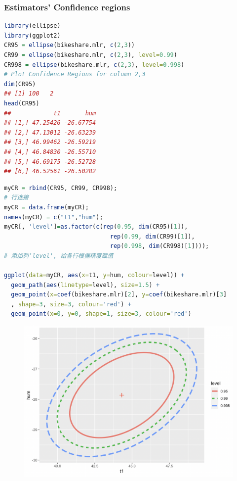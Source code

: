 \documentclass[11pt,a4paper]{article}
\begin{document}
\subsubsection{Estimators' Confidence regions}
\begin{lstlisting}[language=R]
library(ellipse)
library(ggplot2)
CR95 = ellipse(bikeshare.mlr, c(2,3))
CR99 = ellipse(bikeshare.mlr, c(2,3), level=0.99)
CR998 = ellipse(bikeshare.mlr, c(2,3), level=0.998)
# Plot Confidence Regions for column 2,3
dim(CR95)
## [1] 100   2
head(CR95)
##            t1       hum
## [1,] 47.25426 -26.67754
## [2,] 47.13012 -26.63239
## [3,] 46.99462 -26.59219
## [4,] 46.84830 -26.55710
## [5,] 46.69175 -26.52728
## [6,] 46.52561 -26.50282
\end{lstlisting}
\begin{lstlisting}[language=R]
myCR = rbind(CR95, CR99, CR998);
# 行连接
myCR = data.frame(myCR); 
names(myCR) = c("t1","hum"); 
myCR[, 'level']=as.factor(c(rep(0.95, dim(CR95)[1]), 
                              rep(0.99, dim(CR99)[1]), 
                              rep(0.998, dim(CR998)[1])));
# 添加列‘level', 给各行根据精度赋值

ggplot(data=myCR, aes(x=t1, y=hum, colour=level)) + 
  geom_path(aes(linetype=level), size=1.5) + 
  geom_point(x=coef(bikeshare.mlr)[2], y=coef(bikeshare.mlr)[3]
  , shape=3, size=3, colour='red') + 
  geom_point(x=0, y=0, shape=1, size=3, colour='red') 
\end{lstlisting}
\begin{center}\begin{figure}[htbp]
    \centering
    \includegraphics[scale=0.5]{9599998.png}
    \caption{}
    \label{}
\end{figure}\end{center}
\end{document}
